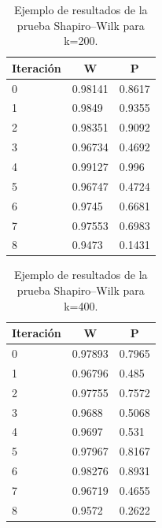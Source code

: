 \documentclass{article}
\begin{document}
\begin{table}[h!]
\centering
\caption{Ejemplo de resultados de la prueba Shapiro–Wilk para k=200.}
\label{tabla6}
\begin{tabular}{|l|l|l|}
\hline
\multicolumn{1}{|c|}{Iteración} & \multicolumn{1}{c|}{W} & \multicolumn{1}{c|}{P} \\ \hline
0 & 0.98141 & 0.8617 \\ \hline
1 & 0.9849 & 0.9355 \\ \hline
2 & 0.98351 & 0.9092 \\ \hline
3 & 0.96734 & 0.4692 \\ \hline
4 & 0.99127 & 0.996 \\ \hline
5 & 0.96747 & 0.4724 \\ \hline
6 & 0.9745 & 0.6681 \\ \hline
7 & 0.97553 & 0.6983 \\ \hline
8 & 0.9473 & 0.1431 \\ \hline
\end{tabular}
\end{table}

\begin{table}[h!]
\centering
\caption{Ejemplo de resultados de la prueba Shapiro–Wilk para k=400.}
\label{tabla7}
\begin{tabular}{|l|l|l|}
\hline
\multicolumn{1}{|c|}{Iteración} & \multicolumn{1}{c|}{W} & \multicolumn{1}{c|}{P} \\ \hline
0 & 0.97893 & 0.7965 \\ \hline
1 & 0.96796 & 0.485 \\ \hline
2 & 0.97755 & 0.7572 \\ \hline
3 & 0.9688 & 0.5068 \\ \hline
4 & 0.9697 & 0.531 \\ \hline
5 & 0.97967 & 0.8167 \\ \hline
6 & 0.98276 & 0.8931 \\ \hline
7 & 0.96719 & 0.4655 \\ \hline
8 & 0.9572 & 0.2622 \\ \hline
\end{tabular}
\end{table}
\end{document}
